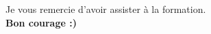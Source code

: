 \begin{center}
Je vous remercie d'avoir assister à la formation.\\ %
\large{\textbf{Bon courage :)}} %
\end{center} %
 
